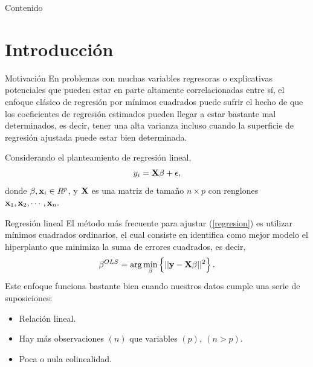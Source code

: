 


\maketitle
\begin{frame}{Contenido}
	\tableofcontents
\end{frame}

\section{Introducción}
\begin{frame}{Motivación}
    En problemas con muchas variables regresoras o explicativas potenciales que pueden estar en parte altamente correlacionadas entre sí, el enfoque clásico de regresión por mínimos cuadrados puede sufrir el hecho de que los coeficientes de regresión estimados pueden llegar a estar bastante mal determinados, es decir, tener una alta varianza incluso cuando la superficie de regresión ajustada puede estar bien determinada. \citep{Boehmke2019HandsOnML}
    
    Considerando el planteamiento de regresión lineal, 
    \begin{align}\label{regresion}
        y_i = \mathbf{X}\beta+\epsilon,
    \end{align}
donde $\beta, \mathbf{x}_i\in R^p$, y $\mathbf{X}$ es una matriz de tamaño $n\times p$ con renglones $\mathbf{x}_1, \mathbf{x}_2, \cdots, \mathbf{x}_n.$
\end{frame}

\begin{frame}{Regresión lineal}
El método más frecuente para ajustar (\ref{regresion}) es utilizar mínimos cuadrados ordinarios, el cual consiste en identifica como mejor modelo el hiperplanto que minimiza la suma de errores cuadrados, es decir,
\begin{align}
    \beta^{OLS} =\arg \min_{\beta} \left\{||\mathbf{y}- \mathbf{X} \beta||^2\right\}.
\end{align}
Este enfoque funciona bastante bien cuando nuestros datos cumple una serie de suposiciones:
\begin{itemize}
    \item Relación lineal.
    \item Hay más observaciones $(n)$ que variables $(p),\ (n>p)$.
    \item Poca o nula colinealidad.
\end{itemize}
\end{frame}


